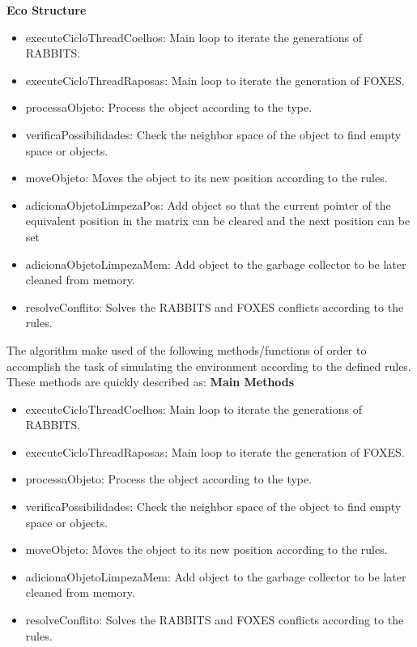 \documentclass[10pt,a4paper,final]{report}
\begin{document}
\textbf{Eco Structure}
\begin{itemize}
\item executeCicloThreadCoelhos: Main loop to iterate the generations of RABBITS.
\item executeCicloThreadRaposas: Main loop to iterate the generation of FOXES.
\item processaObjeto: Process the object according to the type.
\item verificaPossibilidades: Check the neighbor space of the object to find empty space or objects.
\item moveObjeto:  Moves the object to its new position according to the rules.
\item adicionaObjetoLimpezaPos: Add object so that the current pointer of the equivalent position in the matrix can be cleared and the next position can be set
\item adicionaObjetoLimpezaMem: Add object to the garbage collector to be later cleaned from memory.
\item resolveConflito: Solves the RABBITS and FOXES conflicts according to the rules.

\end{itemize}
\bigskip

The algorithm make used of the following methods/functions of order to accomplish the task of simulating the environment according to the defined rules. These methods are quickly described as:
\textbf{Main Methods}
\begin{itemize}
\item executeCicloThreadCoelhos: Main loop to iterate the generations of RABBITS.
\item executeCicloThreadRaposas: Main loop to iterate the generation of FOXES.
\item processaObjeto: Process the object according to the type.
\item verificaPossibilidades: Check the neighbor space of the object to find empty space or objects.
\item moveObjeto:  Moves the object to its new position according to the rules.
\item adicionaObjetoLimpezaMem: Add object to the garbage collector to be later cleaned from memory.
\item resolveConflito: Solves the RABBITS and FOXES conflicts according to the rules.


\end{itemize}
\end{document}
